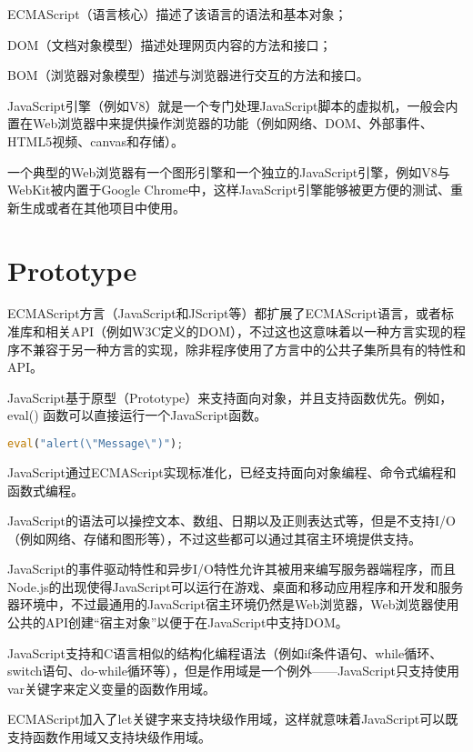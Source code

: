 \begin{compactenum}
\item ECMAScript（语言核心）描述了该语言的语法和基本对象；
\item DOM（文档对象模型）描述处理网页内容的方法和接口；
\item BOM（浏览器对象模型）描述与浏览器进行交互的方法和接口。
\end{compactenum}

JavaScript引擎（例如V8）就是一个专门处理JavaScript脚本的虚拟机，一般会内置在Web浏览器中来提供操作浏览器的功能（例如网络、DOM、外部事件、HTML5视频、canvas和存储）。

一个典型的Web浏览器有一个图形引擎和一个独立的JavaScript引擎，例如V8与WebKit被内置于Google Chrome中，这样JavaScript引擎能够被更方便的测试、重新生成或者在其他项目中使用。



\section{Prototype}

ECMAScript方言（JavaScript和JScript等）都扩展了ECMAScript语言，或者标准库和相关API（例如W3C定义的DOM），不过这也这意味着以一种方言实现的程序不兼容于另一种方言的实现，除非程序使用了方言中的公共子集所具有的特性和API。

JavaScript基于原型（Prototype）来支持面向对象，并且支持函数优先。例如，eval() 函数可以直接运行一个JavaScript函数。


\begin{lstlisting}[language=JavaScript]
eval("alert(\"Message\")");
\end{lstlisting}

JavaScript通过ECMAScript实现标准化，已经支持面向对象编程、命令式编程和函数式编程。

JavaScript的语法可以操控文本、数组、日期以及正则表达式等，但是不支持I/O（例如网络、存储和图形等），不过这些都可以通过其宿主环境提供支持。

JavaScript的事件驱动特性和异步I/O特性允许其被用来编写服务器端程序，而且Node.js的出现使得JavaScript可以运行在游戏、桌面和移动应用程序和开发和服务器环境中，不过最通用的JavaScript宿主环境仍然是Web浏览器，Web浏览器使用公共的API创建“宿主对象”以便于在JavaScript中支持DOM。

JavaScript支持和C语言相似的结构化编程语法（例如if条件语句、while循环、switch语句、do-while循环等），但是作用域是一个例外——JavaScript只支持使用var关键字来定义变量的函数作用域。

ECMAScript加入了let关键字来支持块级作用域，这样就意味着JavaScript可以既支持函数作用域又支持块级作用域。

